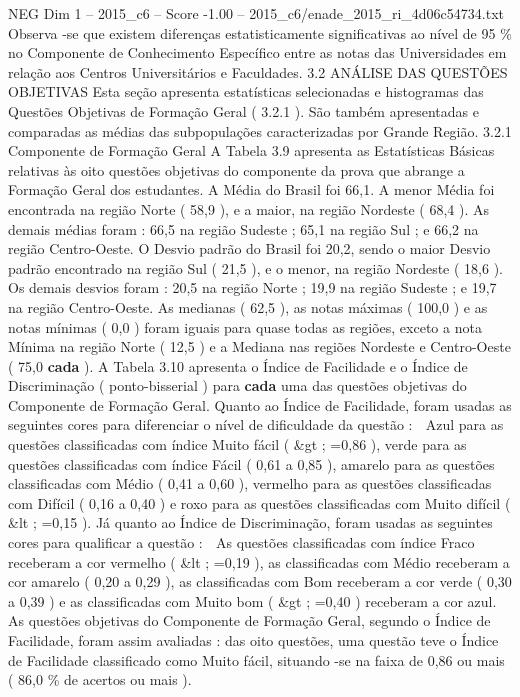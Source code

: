 \begin{textsample}{NEG Dim 1 – 2015\_c6 – Score -1.00 – 2015\_c6/enade\_2015\_ri\_4d06c54734.txt}
Observa -se que existem diferenças estatisticamente significativas ao nível de 95 \% no Componente de Conhecimento Específico entre as notas das Universidades em relação aos Centros Universitários e Faculdades. 3.2 ANÁLISE DAS QUESTÕES OBJETIVAS Esta seção apresenta estatísticas selecionadas e histogramas das Questões Objetivas de Formação Geral ( 3.2.1 ).
São também apresentadas e comparadas as médias das subpopulações caracterizadas por Grande Região. 3.2.1 Componente de Formação Geral A Tabela 3.9 apresenta as Estatísticas Básicas relativas às oito questões objetivas do componente da prova que abrange a Formação Geral dos estudantes.
A Média do Brasil foi 66,1.
A menor Média foi encontrada na região Norte ( 58,9 ), e a maior, na região Nordeste ( 68,4 ).
As demais médias foram : 66,5 na região Sudeste ; 65,1 na região Sul ; e 66,2 na região Centro-Oeste.
O Desvio padrão do Brasil foi 20,2, sendo o maior Desvio padrão encontrado na região Sul ( 21,5 ), e o menor, na região Nordeste ( 18,6 ).
Os demais desvios foram : 20,5 na região Norte ; 19,9 na região Sudeste ; e 19,7 na região Centro-Oeste.
As medianas ( 62,5 ), as notas máximas ( 100,0 ) e as notas mínimas ( 0,0 ) foram iguais para quase todas as regiões, exceto a nota Mínima na região Norte ( 12,5 ) e a Mediana nas regiões Nordeste e Centro-Oeste ( 75,0 \textbf{cada} ).
A Tabela 3.10 apresenta o Índice de Facilidade e o Índice de Discriminação ( ponto-bisserial ) para \textbf{cada} uma das questões objetivas do Componente de Formação Geral.
Quanto ao Índice de Facilidade, foram usadas as seguintes cores para diferenciar o nível de dificuldade da questão :  Azul para as questões classificadas com índice Muito fácil ( \&gt ; =0,86 ), verde para as questões classificadas com índice Fácil ( 0,61 a 0,85 ), amarelo para as questões classificadas com Médio ( 0,41 a 0,60 ), vermelho para as questões classificadas com Difícil ( 0,16 a 0,40 ) e roxo para as questões classificadas com Muito difícil ( \&lt ; =0,15 ).
Já quanto ao Índice de Discriminação, foram usadas as seguintes cores para qualificar a questão :  As questões classificadas com índice Fraco receberam a cor vermelho ( \&lt ; =0,19 ), as classificadas com Médio receberam a cor amarelo ( 0,20 a 0,29 ), as classificadas com Bom receberam a cor verde ( 0,30 a 0,39 ) e as classificadas com Muito bom ( \&gt ; =0,40 ) receberam a cor azul.
As questões objetivas do Componente de Formação Geral, segundo o Índice de Facilidade, foram assim avaliadas : das oito questões, uma questão teve o Índice de Facilidade classificado como Muito fácil, situando -se na faixa de 0,86 ou mais ( 86,0 \% de acertos ou mais ).

\end{textsample}
